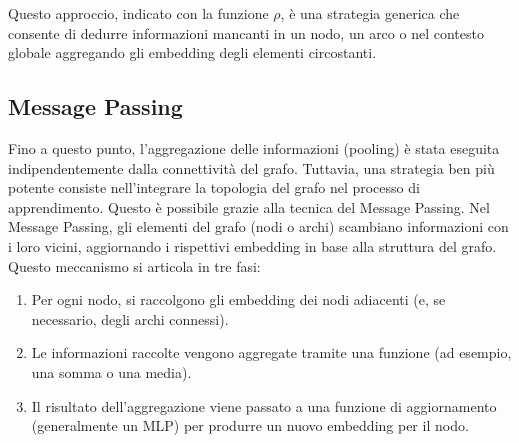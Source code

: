 Questo approccio, indicato con la funzione $\rho$, è una strategia generica che consente di dedurre informazioni mancanti in un nodo, un arco o nel contesto globale aggregando gli embedding degli elementi circostanti.

\subsection{Message Passing}

Fino a questo punto, l’aggregazione delle informazioni (pooling) è stata eseguita indipendentemente dalla connettività del grafo. Tuttavia, una strategia ben più potente consiste nell’integrare la topologia del grafo nel processo di apprendimento. Questo è possibile grazie alla tecnica del Message Passing. Nel Message Passing, gli elementi del grafo (nodi o archi) scambiano informazioni con i loro vicini, aggiornando i rispettivi embedding in base alla struttura del grafo. Questo meccanismo si articola in tre fasi:

\begin{enumerate}
    \item Per ogni nodo, si raccolgono gli embedding dei nodi adiacenti (e, se necessario, degli archi connessi).
    \item Le informazioni raccolte vengono aggregate tramite una funzione (ad esempio, una somma o una media).
    \item Il risultato dell’aggregazione viene passato a una funzione di aggiornamento (generalmente un MLP) per produrre un nuovo embedding per il nodo.
\end{enumerate}

